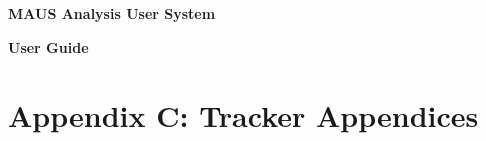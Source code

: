 \documentclass[a4paper, 10pt] {report}
\begin{document}
\vspace*{2.0cm}

\begin{center}
\Large{ \bf{MAUS Analysis User System} }

\Large{ \bf{User Guide} }
\end{center}

\tableofcontents

\newpage










%
%
%



%



\chapter{Appendix C: Tracker Appendices}
\label{chapter:TrackerAppendices}

\end{document}
